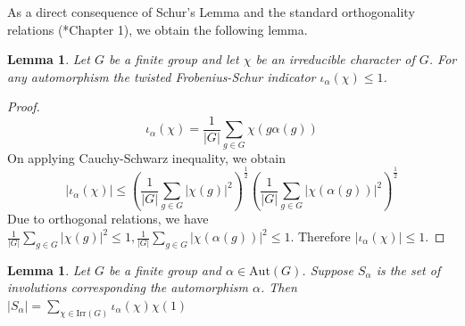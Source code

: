\documentclass[oneside]{amsart}
\theoremstyle{plain}
\newtheorem{lemma}[theorem]{Lemma} %
\theoremstyle{definition}
\theoremstyle{remark}
\begin{document}
    As a direct consequence of Schur's Lemma and the standard orthogonality relations (\cite{MR1824028}*{Chapter 1}), we obtain the following lemma.

    \begin{lemma}\label{bound_of_tfsi}
        Let $G$ be a finite group and let $\chi$ be an irreducible character of $G$. For any automorphism the twisted Frobenius-Schur indicator $\iota_{\alpha}(\chi) \leq 1$.
    \end{lemma}
    \begin{proof}
        \begin{equation}
            \iota_{\alpha}(\chi) = \frac{1}{|G|} \sum_{g \in G} \chi(g \alpha(g))
        \end{equation}
        On applying Cauchy-Schwarz inequality, we obtain
        \begin{equation}
            \left|\iota_{\alpha}(\chi)\right|\leq \left(\frac{1}{|G|} \sum_{g \in G} \left|\chi(g)\right|^2\right)^{\frac{1}{2}}\left(\frac{1}{|G|} \sum_{g \in G} \left|\chi(\alpha(g))\right|^2\right)^{\frac{1}{2}}
        \end{equation}
        Due to orthogonal relations, we have $\frac{1}{|G|} \sum_{g \in G} \left|\chi(g)\right|^2 \leq 1, \frac{1}{|G|} \sum_{g \in G} \left|\chi(\alpha(g))\right|^2 \leq 1$. Therefore $\left|\iota_{\alpha}(\chi)\right| \leq 1$.
    \end{proof}
    \begin{lemma}{\label{involution_set_relation}}
        Let $G$ be a finite group and $\alpha \in \mathrm{Aut}(G)$. Suppose $S_{\alpha}$ is the set of involutions corresponding the automorphism $\alpha$. Then $| S_{\alpha}| = \sum_{\chi \in \mathrm{Irr}(G)}\iota_{\alpha}(\chi) \chi(1)$
    \end{lemma}
\end{document}

